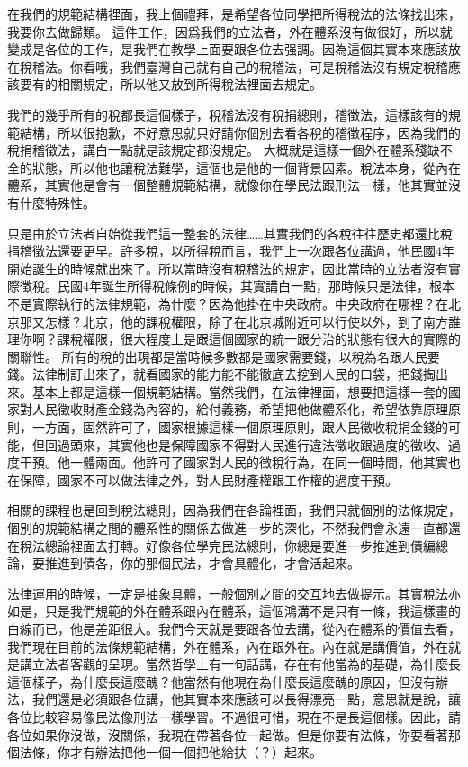 \documentclass[]{ctexbook}
\begin{document}
在我們的規範結構裡面，我上個禮拜，是希望各位同學把所得稅法的法條找出來，我要你去做歸類。
這件工作，因爲我們的立法者，外在體系沒有做很好，所以就變成是各位的工作，是我們在教學上面要跟各位去强調。因為這個其實本來應該放在稅稽法。你看哦，我們臺灣自己就有自己的稅稽法，可是稅稽法沒有規定稅稽應該要有的相關規定，所以他又放到所得稅法裡面去規定。

我們的幾乎所有的稅都長這個樣子，稅稽法沒有稅捐總則，稽徵法，這樣該有的規範結構，所以很抱歉，不好意思就只好請你個別去看各稅的稽徵程序，因為我們的稅捐稽徵法，講白一點就是該規定都沒規定。
大概就是這樣一個外在體系殘缺不全的狀態，所以他也讓稅法難學，這個也是他的一個背景因素。稅法本身，從內在體系，其實他是會有一個整體規範結構，就像你在學民法跟刑法一樣，他其實並沒有什麼特殊性。

只是由於立法者自始從我們這一整套的法律\ldots\ldots 其實我們的各稅往往歷史都還比稅捐稽徵法還要更早。許多稅，以所得稅而言，我們上一次跟各位講過，他民國4年開始誕生的時候就出來了。所以當時沒有稅稽法的規定，因此當時的立法者沒有實際徵稅。民國4年誕生所得稅條例的時候，其實講白一點，那時候只是法律，根本不是實際執行的法律規範，為什麼？因為他掛在中央政府。中央政府在哪裡？在北京那又怎樣？北京，他的課稅權限，除了在北京城附近可以行使以外，到了南方誰理你啊？課稅權限，很大程度上是跟這個國家的統一跟分治的狀態有很大的實際的關聯性。
所有的稅的出現都是當時候多數都是國家需要錢，以稅為名跟人民要錢。法律制訂出來了，就看國家的能力能不能徹底去挖到人民的口袋，把錢掏出來。基本上都是這樣一個規範結構。當然我們，在法律裡面，想要把這樣一套的國家對人民徵收財產金錢為內容的，給付義務，希望把他做體系化，希望依靠原理原則，一方面，固然許可了，國家根據這樣一個原理原則，跟人民徵收稅捐金錢的可能，但回過頭來，其實他也是保障國家不得對人民進行違法徵收跟過度的徵收、過度干預。他一體兩面。他許可了國家對人民的徵稅行為，在同一個時間，他其實也在保障，國家不可以做法律之外，對人民財產權跟工作權的過度干預。

相關的課程也是回到稅法總則，因為我們在各論裡面，我們只就個別的法條規定，個別的規範結構之間的體系性的關係去做進一步的深化，不然我們會永遠一直都還在稅法總論裡面去打轉。好像各位學完民法總則，你總是要進一步推進到債編總論，要推進到債各，你的那個民法，才會具體化，才會活起來。

法律運用的時候，一定是抽象具體，一般個別之間的交互地去做提示。其實稅法亦如是，只是我們規範的外在體系跟內在體系，這個鴻溝不是只有一條，我這樣畫的白線而已，他是差距很大。我們今天就是要跟各位去講，從內在體系的價值去看，我們現在目前的法條規範結構，外在體系，內在跟外在。內在就是講價值，外在就是講立法者客觀的呈現。當然哲學上有一句話講，存在有他當為的基礎，為什麼長這個樣子，為什麼長這麼醜？他當然有他現在為什麼長這麼醜的原因，但沒有辦法，我們還是必須跟各位講，他其實本來應該可以長得漂亮一點，意思就是說，讓各位比較容易像民法像刑法一樣學習。不過很可惜，現在不是長這個樣。因此，請各位如果你沒做，沒關係，我現在帶著各位一起做。但是你要有法條，你要看著那個法條，你才有辦法把他一個一個把他給扶（？）起來。
\end{document}
